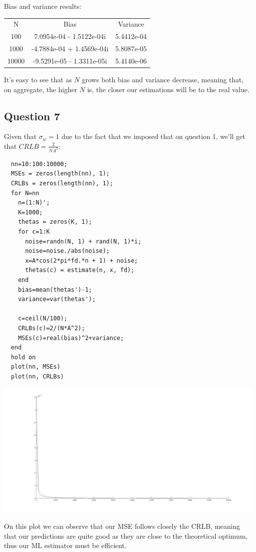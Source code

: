 \documentclass[conference,9pt]{IEEEtran}
\begin{document}
Bias and variance results:
\begin{center}
  \begin{tabular}{ c c c }
   N & Bias & Variance \\ 
   100 & 7.0954e-04 - 1.5122e-04i & 5.4412e-04 \\  
   1000 & -4.7884e-04 + 1.4569e-04i & 5.8087e-05 \\  
   10000 & -9.5291e-05 - 1.3311e-05i & 5.4140e-06  
  \end{tabular}
\end{center}

It's easy to see that as $N$ grows both bias and variance decrease, meaning that, on aggregate, the higher $N$ is, the closer our estimations will be to the real value.


\subsection{Question 7}
Given that $\sigma_w = 1$ due to the fact that we imposed that on question 1, we'll get that $CRLB=\frac{2}{NA^2}$:

\begin{verbatim}
  nn=10:100:10000;    
  MSEs = zeros(length(nn), 1);
  CRLBs = zeros(length(nn), 1);
  for N=nn
    n=(1:N)';
    K=1000;
    thetas = zeros(K, 1);
    for c=1:K
      noise=randn(N, 1) + rand(N, 1)*i;
      noise=noise./abs(noise);
      x=A*cos(2*pi*fd.*n + 1) + noise;
      thetas(c) = estimate(n, x, fd);
    end
    bias=mean(thetas')-1;
    variance=var(thetas');
  
    c=ceil(N/100);
    CRLBs(c)=2/(N*A^2);
    MSEs(c)=real(bias)^2+variance;
  end
  hold on
  plot(nn, MSEs)
  plot(nn, CRLBs)
\end{verbatim}


\includegraphics[scale=0.20]{b7}

On this plot we can observe that our MSE follows closely the CRLB, meaning that our predictions are quite good as they are close to the theoretical optimum, thus our ML estimator must be efficient.
\end{document}
